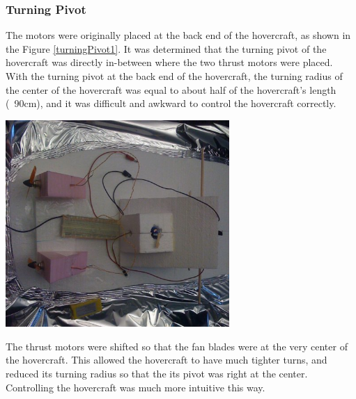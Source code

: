 \begin{minipage}{6.5in}
\begin{minipage}{6.5in}
\subsubsection{Turning Pivot}
The motors were originally placed at the back end of the hovercraft, as shown in the Figure \ref{turningPivot1}.  It was determined that the turning pivot of the hovercraft was directly in-between where the two thrust motors were placed. With the turning pivot at the back end of the hovercraft, the turning radius of the center of the hovercraft was equal to about half of the hovercraft's length (~90cm), and it was difficult and awkward to control the hovercraft correctly. 

\begin{minipage}{6.5in}
\begin{center}
  \includegraphics[width=85mm]{imageSources/turningPivot1.png}
\end{center}
\label{turningPivot1}
\end{minipage}

The thrust motors were shifted so that the fan blades were at the very center of the hovercraft. This allowed the hovercraft to have much tighter turns, and reduced its turning radius so that the its pivot was right at the center. Controlling the hovercraft was much more intuitive this way.


\end{minipage}
\end{minipage}
